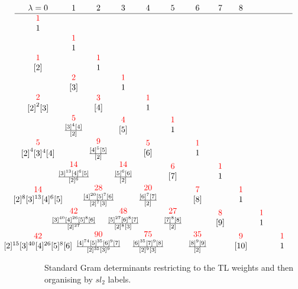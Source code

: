 \documentclass{article}
\theoremstyle{definition}
\numberwithin{equation}{subsection}
\begin{document}
\begin{figure}
  
%
%
%
%
\[ { } \hspace{-.53in} 
\begin{array}{ccccccccccccccccc}
  \lambda=0         &  1             &  2      &  3  &  4  &  5   & 6 & 7 & 8 
  \\ \hline
 \du{1}{1} \\ 
                  & \du{1}{1}  \\ 
 \du{1}{{[2]}}     &                  & \du{1}{1} \\ 
                  & \du{2}{[3]}                &     & \du{1}{1}   \\ 
 \du{2}{{[ 2]}^2 [3]}  &                     & \du{3}{[4]} &    & \du{1}{1}  \\
               & \du{5}{{\frac{ [3]^4 [4]}{[2]}^{}}} &  & \du{4}{[5]} &  & \du{1}{1} \\ 
 \du{5}{{[2]}^4 [3]^4 [4]} &              & \du{9}{{\frac{[4]^5[5]}{[2]}^{}}} &    & \du{5}{[6]} & & \du{1}{1}  \\
              & \du{14}{\frac{[3]^{13}[4]^6[5]}{[2]^{6}}} &&\du{14}{\frac{[5]^6[6]}{[2]^{}}} && \du{6}{[7]} && \du{1}{1}
 \\
 \du{14}{[2]^8[3]^{13}[4]^6[5]}  &&      \du{28}{\frac{[4]^{20}[5]^7[6]}{[2]^{7}[3]^{}}} && \du{20}{\frac{[6]^7[7]}{[2]^{}}} && \du{7}{[8]}  &&  \du{1}{1} \\
              & \du{42}{\frac{[3]^{40}[4]^{26}[5]^8[6]}{[2]^{27}}} && \du{48}{\frac{[5]^{27}[6]^8[7]}{[2]^{8}[3]^{}}} && \du{27}{\frac{[7]^8[8]}{[2]^{}}} && \du{8}{[9]} && \du{1}{1}
 \\
 \du{42}{[2]^{15}[3]^{40}[4]^{26}[5]^{8}[6]} && \du{90}{\frac{[4]^{74}[5]^{35}[6]^{9}[7]}{[2]^{35}[3]^{9}}} && \du{75}{
 \frac{  [6]^{35}[7]^{9}[8]}{[2]^{9}[3]^{}}} && \du{35}{\frac{[8]^9[9]}{[2]^{}}} && \du{9}{[10]} && \du{1}{1}
\end{array}
\]



  \caption{Standard Gram determinants restricting to the TL weights and then organising by $sl_2$ labels.
    \label{fig:gramdets01}}
\end{figure}
\end{document}
